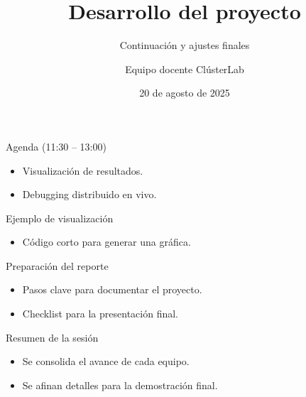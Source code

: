 \documentclass[aspectratio=169,professionalfonts]{beamer}
\title[Cl\'usterLab \bullet{} D\'ia 7]{Desarrollo del proyecto}
\subtitle{Continuaci\'on y ajustes finales}
\author{Equipo docente Cl\'usterLab}
\date{20 de agosto de 2025}
\begin{document}
\begin{frame}[plain]
  \titlepage
\end{frame}

\begin{frame}{Agenda (11:30 -- 13:00)}
  \begin{itemize}
    \item Visualizaci\'on de resultados.
    \item Debugging distribuido en vivo.
  \end{itemize}
\end{frame}

\begin{frame}[fragile]{Ejemplo de visualizaci\'on}
  \begin{itemize}
    \item C\'odigo corto para generar una gr\'afica.
  \end{itemize}
\end{frame}

\begin{frame}{Preparaci\'on del reporte}
  \begin{itemize}
    \item Pasos clave para documentar el proyecto.
    \item Checklist para la presentaci\'on final.
  \end{itemize}
\end{frame}

\begin{frame}{Resumen de la sesi\'on}
  \begin{itemize}
    \item Se consolida el avance de cada equipo.
    \item Se afinan detalles para la demostraci\'on final.
  \end{itemize}
\end{frame}
\end{document}
